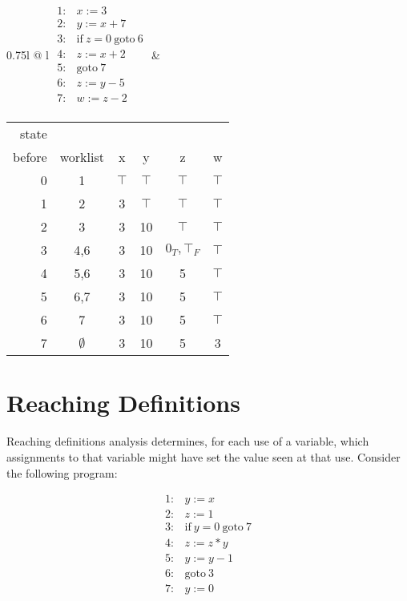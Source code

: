 \documentclass[11pt]{article}
\begin{document}
\begin{centering}
\begin{tabular*}{0.75\textwidth}{l @{\extracolsep{\fill}} l}
$
\begin{array}{ll}
1: & x := 3\\
2: & y := x + 7\\
3: & \mbox{if}~ z = 0 ~\mbox{goto}~ 6\\
4: & z := x + 2\\
5: & \mbox{goto}~ 7\\
6: & z := y - 5\\
7: & w := z - 2\\
\end{array}
$
&

\begin{tabular}{r | c | c c c c}
state &          &   &   &   &   \\
before & worklist & x & y & z & w \\
\hline
0  & 1   & $\top$ & $\top$ & $\top$ & $\top$ \\
1  & 2   & 3 & $\top$ & $\top$ & $\top$ \\
2  & 3   & 3 & 10 & $\top$ & $\top$ \\
3  & 4,6 & 3 & 10 & $0_T,\top_F$ & $\top$ \\
4  & 5,6 & 3 & 10 & 5 & $\top$ \\
5  & 6,7 & 3 & 10 & 5 & $\top$ \\
6  & 7   & 3 & 10 & 5 & $\top$ \\
7  & $\emptyset$   & 3 & 10 & 5 & 3 \\

\end{tabular}

\end{tabular*}

\end{centering}




\section{Reaching Definitions}

Reaching definitions analysis determines, for each use of a variable, which assignments to that variable might have set the value seen at that use.  Consider the following program:

\[
\begin{array}{ll}
1: & y := x\\
2: & z := 1\\
3: & \mbox{if}~ y = 0 ~\mbox{goto}~ 7\\
4: & z := z * y\\
5: & y := y - 1\\
6: & \mbox{goto}~ 3\\
7: & y := 0\\
\end{array}
\]
\end{document}
